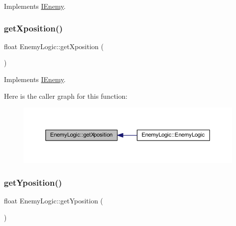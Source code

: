 Implements \hyperlink{class_i_enemy_ab1fb8f6320916ef6a1497f9651704d05}{I\+Enemy}.

\mbox{\label{class_enemy_logic_a7eed969ab8e3d2527cdac04ef39a5aba}} 
\subsubsection{\texorpdfstring{get\+Xposition()}{getXposition()}}
{\footnotesize\ttfamily float Enemy\+Logic\+::get\+Xposition (\begin{DoxyParamCaption}{ }\end{DoxyParamCaption})\hspace{0.3cm}{\ttfamily [virtual]}}



Implements \hyperlink{class_i_enemy_a504ea7fa77b8984d5b9dd71352876943}{I\+Enemy}.

Here is the caller graph for this function\+:
\nopagebreak
\begin{figure}[H]
\begin{center}
\leavevmode
\includegraphics[width=350pt]{class_enemy_logic_a7eed969ab8e3d2527cdac04ef39a5aba_icgraph}
\end{center}
\end{figure}
\mbox{\label{class_enemy_logic_ae614032054926a4a25ed56f61111392b}} 
\subsubsection{\texorpdfstring{get\+Yposition()}{getYposition()}}
{\footnotesize\ttfamily float Enemy\+Logic\+::get\+Yposition (\begin{DoxyParamCaption}{ }\end{DoxyParamCaption})\hspace{0.3cm}{\ttfamily [virtual]}}



